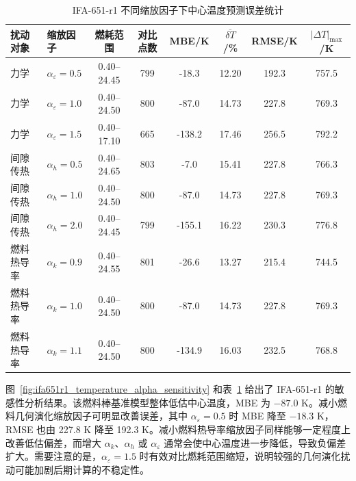 \begin{table}[H]
	\centering
	\caption{IFA-651-r1 不同缩放因子下中心温度预测误差统计}
	\label{tab:ifa651r1_temperature_alpha_sensitivity_error}
	\small
	\begin{tabular}{llcccccc}
		\toprule
		扰动对象 & 缩放因子 & 燃耗范围 & 对比点数 & MBE/K & $\overline{\delta T}$/\% & RMSE/K & $|\Delta T|_{\max}$/K \\
		\midrule
		力学 & $\alpha_{\varepsilon}=0.5$ & 0.40--24.45 & 799 & -18.3 & 12.20 & 192.3 & 757.5 \\
		力学 & $\alpha_{\varepsilon}=1.0$ & 0.40--24.50 & 800 & -87.0 & 14.73 & 227.8 & 769.3 \\
		力学 & $\alpha_{\varepsilon}=1.5$ & 0.40--17.10 & 665 & -138.2 & 17.46 & 256.5 & 792.2 \\
		\midrule
		间隙传热 & $\alpha_h=0.5$ & 0.40--24.65 & 803 & -7.0 & 15.41 & 227.8 & 766.3 \\
		间隙传热 & $\alpha_h=1.0$ & 0.40--24.50 & 800 & -87.0 & 14.73 & 227.8 & 769.3 \\
		间隙传热 & $\alpha_h=2.0$ & 0.40--24.45 & 799 & -155.1 & 16.22 & 230.3 & 776.8 \\
		\midrule
		燃料热导率 & $\alpha_k=0.9$ & 0.40--24.55 & 801 & -26.6 & 13.27 & 215.4 & 744.5 \\
		燃料热导率 & $\alpha_k=1.0$ & 0.40--24.50 & 800 & -87.0 & 14.73 & 227.8 & 769.3 \\
		燃料热导率 & $\alpha_k=1.1$ & 0.40--24.50 & 800 & -134.9 & 16.03 & 232.5 & 768.8 \\
		\bottomrule
	\end{tabular}
\end{table}
图~\ref{fig:ifa651r1_temperature_alpha_sensitivity} 和表~\ref{tab:ifa651r1_temperature_alpha_sensitivity_error} 给出了 IFA-651-r1 的敏感性分析结果。该燃料棒基准模型整体低估中心温度，MBE 为 \(-87.0\) K。减小燃料几何演化缩放因子可明显改善误差，其中 \(\alpha_{\varepsilon}=0.5\) 时 MBE 降至 \(-18.3\) K，RMSE 也由 227.8 K 降至 192.3 K。减小燃料热导率缩放因子同样能够一定程度上改善低估偏差，而增大 \(\alpha_k\)、\(\alpha_h\) 或 \(\alpha_{\varepsilon}\) 通常会使中心温度进一步降低，导致负偏差扩大。需要注意的是，\(\alpha_{\varepsilon}=1.5\) 时有效对比燃耗范围缩短，说明较强的几何演化扰动可能加剧后期计算的不稳定性。

